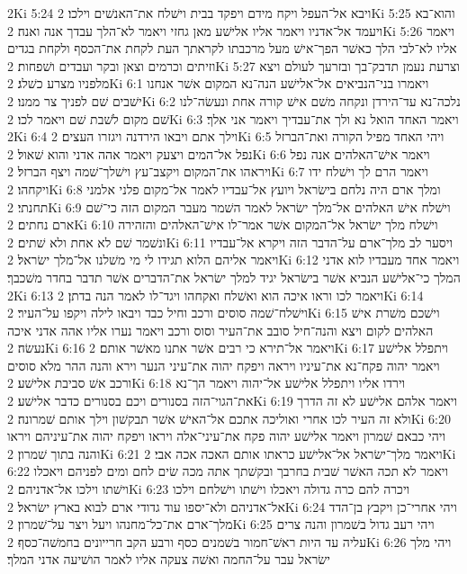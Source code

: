 2Ki 5:24  ויבא אל־העפל ויקח מידם ויפקד בבית וישׁלח את־האנשׁים וילכו׃
2Ki 5:25  והוא־בא ויעמד אל־אדניו ויאמר אליו אלישׁע מאן גחזי ויאמר לא־הלך עבדך אנה ואנה׃
2Ki 5:26  ויאמר אליו לא־לבי הלך כאשׁר הפך־אישׁ מעל מרכבתו לקראתך העת לקחת את־הכסף ולקחת בגדים וזיתים וכרמים וצאן ובקר ועבדים ושׁפחות׃
2Ki 5:27  וצרעת נעמן תדבק־בך ובזרעך לעולם ויצא מלפניו מצרע כשׁלג׃
2Ki 6:1  ויאמרו בני־הנביאים אל־אלישׁע הנה־נא המקום אשׁר אנחנו ישׁבים שׁם לפניך צר ממנו׃
2Ki 6:2  נלכה־נא עד־הירדן ונקחה משׁם אישׁ קורה אחת ונעשׂה־לנו שׁם מקום לשׁבת שׁם ויאמר לכו׃
2Ki 6:3  ויאמר האחד הואל נא ולך את־עבדיך ויאמר אני אלך׃
2Ki 6:4  וילך אתם ויבאו הירדנה ויגזרו העצים׃
2Ki 6:5  ויהי האחד מפיל הקורה ואת־הברזל נפל אל־המים ויצעק ויאמר אהה אדני והוא שׁאול׃
2Ki 6:6  ויאמר אישׁ־האלהים אנה נפל ויראהו את־המקום ויקצב־עץ וישׁלך־שׁמה ויצף הברזל׃
2Ki 6:7  ויאמר הרם לך וישׁלח ידו ויקחהו׃
2Ki 6:8  ומלך ארם היה נלחם בישׂראל ויועץ אל־עבדיו לאמר אל־מקום פלני אלמני תחנתי׃
2Ki 6:9  וישׁלח אישׁ האלהים אל־מלך ישׂראל לאמר השׁמר מעבר המקום הזה כי־שׁם ארם נחתים׃
2Ki 6:10  וישׁלח מלך ישׂראל אל־המקום אשׁר אמר־לו אישׁ־האלהים והזהירה ונשׁמר שׁם לא אחת ולא שׁתים׃
2Ki 6:11  ויסער לב מלך־ארם על־הדבר הזה ויקרא אל־עבדיו ויאמר אליהם הלוא תגידו לי מי משׁלנו אל־מלך ישׂראל׃
2Ki 6:12  ויאמר אחד מעבדיו לוא אדני המלך כי־אלישׁע הנביא אשׁר בישׂראל יגיד למלך ישׂראל את־הדברים אשׁר תדבר בחדר משׁכבך׃
2Ki 6:13  ויאמר לכו וראו איכה הוא ואשׁלח ואקחהו ויגד־לו לאמר הנה בדתן׃
2Ki 6:14  וישׁלח־שׁמה סוסים ורכב וחיל כבד ויבאו לילה ויקפו על־העיר׃
2Ki 6:15  וישׁכם משׁרת אישׁ האלהים לקום ויצא והנה־חיל סובב את־העיר וסוס ורכב ויאמר נערו אליו אהה אדני איכה נעשׂה׃
2Ki 6:16  ויאמר אל־תירא כי רבים אשׁר אתנו מאשׁר אותם׃
2Ki 6:17  ויתפלל אלישׁע ויאמר יהוה פקח־נא את־עיניו ויראה ויפקח יהוה את־עיני הנער וירא והנה ההר מלא סוסים ורכב אשׁ סביבת אלישׁע׃
2Ki 6:18  וירדו אליו ויתפלל אלישׁע אל־יהוה ויאמר הך־נא את־הגוי־הזה בסנורים ויכם בסנורים כדבר אלישׁע׃
2Ki 6:19  ויאמר אלהם אלישׁע לא זה הדרך ולא זה העיר לכו אחרי ואוליכה אתכם אל־האישׁ אשׁר תבקשׁון וילך אותם שׁמרונה׃
2Ki 6:20  ויהי כבאם שׁמרון ויאמר אלישׁע יהוה פקח את־עיני־אלה ויראו ויפקח יהוה את־עיניהם ויראו והנה בתוך שׁמרון׃
2Ki 6:21  ויאמר מלך־ישׂראל אל־אלישׁע כראתו אותם האכה אכה אבי׃
2Ki 6:22  ויאמר לא תכה האשׁר שׁבית בחרבך ובקשׁתך אתה מכה שׂים לחם ומים לפניהם ויאכלו וישׁתו וילכו אל־אדניהם׃
2Ki 6:23  ויכרה להם כרה גדולה ויאכלו וישׁתו וישׁלחם וילכו אל־אדניהם ולא־יספו עוד גדודי ארם לבוא בארץ ישׂראל׃
2Ki 6:24  ויהי אחרי־כן ויקבץ בן־הדד מלך־ארם את־כל־מחנהו ויעל ויצר על־שׁמרון׃
2Ki 6:25  ויהי רעב גדול בשׁמרון והנה צרים עליה עד היות ראשׁ־חמור בשׁמנים כסף ורבע הקב חרייונים בחמשׁה־כסף׃
2Ki 6:26  ויהי מלך ישׂראל עבר על־החמה ואשׁה צעקה אליו לאמר הושׁיעה אדני המלך׃
